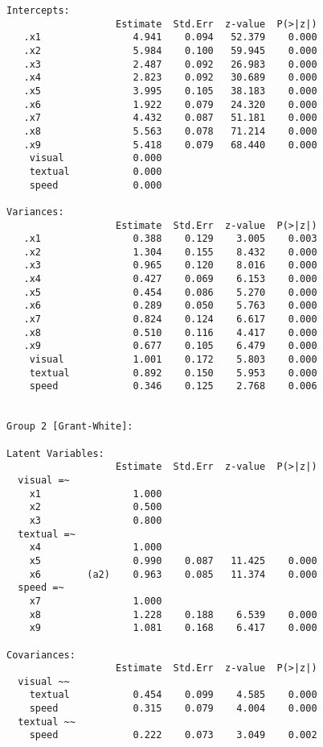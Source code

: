 \begin{verbatim}
Intercepts:
                   Estimate  Std.Err  z-value  P(>|z|)
   .x1                4.941    0.094   52.379    0.000
   .x2                5.984    0.100   59.945    0.000
   .x3                2.487    0.092   26.983    0.000
   .x4                2.823    0.092   30.689    0.000
   .x5                3.995    0.105   38.183    0.000
   .x6                1.922    0.079   24.320    0.000
   .x7                4.432    0.087   51.181    0.000
   .x8                5.563    0.078   71.214    0.000
   .x9                5.418    0.079   68.440    0.000
    visual            0.000                           
    textual           0.000                           
    speed             0.000                           

Variances:
                   Estimate  Std.Err  z-value  P(>|z|)
   .x1                0.388    0.129    3.005    0.003
   .x2                1.304    0.155    8.432    0.000
   .x3                0.965    0.120    8.016    0.000
   .x4                0.427    0.069    6.153    0.000
   .x5                0.454    0.086    5.270    0.000
   .x6                0.289    0.050    5.763    0.000
   .x7                0.824    0.124    6.617    0.000
   .x8                0.510    0.116    4.417    0.000
   .x9                0.677    0.105    6.479    0.000
    visual            1.001    0.172    5.803    0.000
    textual           0.892    0.150    5.953    0.000
    speed             0.346    0.125    2.768    0.006


Group 2 [Grant-White]:

Latent Variables:
                   Estimate  Std.Err  z-value  P(>|z|)
  visual =~                                           
    x1                1.000                           
    x2                0.500                           
    x3                0.800                           
  textual =~                                          
    x4                1.000                           
    x5                0.990    0.087   11.425    0.000
    x6        (a2)    0.963    0.085   11.374    0.000
  speed =~                                            
    x7                1.000                           
    x8                1.228    0.188    6.539    0.000
    x9                1.081    0.168    6.417    0.000

Covariances:
                   Estimate  Std.Err  z-value  P(>|z|)
  visual ~~                                           
    textual           0.454    0.099    4.585    0.000
    speed             0.315    0.079    4.004    0.000
  textual ~~                                          
    speed             0.222    0.073    3.049    0.002


\end{verbatim}
